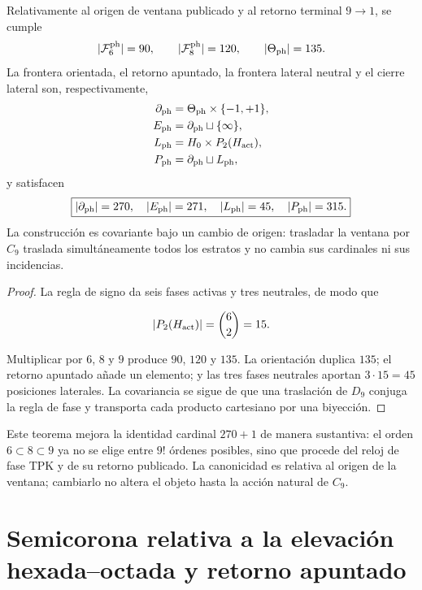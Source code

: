 \begin{theorem}
\label{thm:semicorona-fase-tpk}
Relativamente al origen de ventana publicado y al retorno terminal
\(9\to1\), se cumple
\[
 |\mathcal F^{\rm ph}_6|=90,
 \qquad
 |\mathcal F^{\rm ph}_8|=120,
 \qquad
 |\Theta_{\rm ph}|=135.
\]
La frontera orientada, el retorno apuntado, la frontera lateral neutral y el
cierre lateral son, respectivamente,
\[
\begin{aligned}
 \partial_{\rm ph}&=\Theta_{\rm ph}\times\{-1,+1\},\\
 E_{\rm ph}&=\partial_{\rm ph}\sqcup\{\infty\},\\
 L_{\rm ph}&=H_0\times P_2(H_{\rm act}),\\
 P_{\rm ph}&=\partial_{\rm ph}\sqcup L_{\rm ph},
\end{aligned}
\]
y satisfacen
\[
 \boxed{|\partial_{\rm ph}|=270,\quad
 |E_{\rm ph}|=271,\quad |L_{\rm ph}|=45,\quad
 |P_{\rm ph}|=315.}
\]
La construcción es covariante bajo un cambio de origen: trasladar la ventana
por \(C_9\) traslada simultáneamente todos los estratos y no cambia sus
cardinales ni sus incidencias.
\end{theorem}

\begin{proof}
La regla de signo da seis fases activas y tres neutrales, de modo que

\[
 |P_2(H_{\rm act})|=\binom62=15.
\]

Multiplicar por \(6\), \(8\) y \(9\) produce \(90\), \(120\) y \(135\).
La orientación duplica \(135\); el retorno apuntado añade un elemento; y las
tres fases neutrales aportan \(3\cdot15=45\) posiciones laterales. La
covariancia se sigue de que una traslación de \(D_9\) conjuga la regla de fase
y transporta cada producto cartesiano por una biyección.
\end{proof}

Este teorema mejora la identidad cardinal \(270+1\) de manera sustantiva: el
orden \(6\subset8\subset9\) ya no se elige entre \(9!\) órdenes posibles,
sino que procede del reloj de fase TPK y de su retorno publicado. La
canonicidad es relativa al origen de la ventana; cambiarlo no altera el
objeto hasta la acción natural de \(C_9\).

\section{Semicorona relativa a la elevación
hexada--octada y retorno apuntado}

